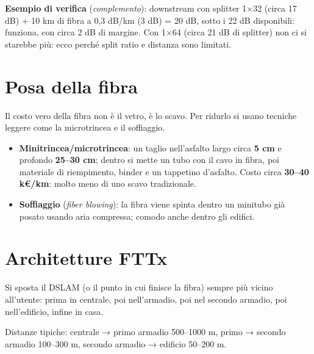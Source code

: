 \textbf{Esempio di verifica} (\emph{complemento}): downstream con splitter 1×32 (circa 17 dB) + 10 km di fibra a 0,3 dB/km (3 dB) = 20 dB, sotto i 22 dB disponibili: funziona, con circa 2 dB di margine. Con 1×64 (circa 21 dB di splitter) non ci si starebbe più: ecco perché split ratio e distanza sono limitati.

\section{Posa della fibra}

\begin{inbreve}

Il costo vero della fibra non è il vetro, è lo scavo. Per ridurlo si usano tecniche leggere come la microtrincea e il soffiaggio.

\end{inbreve}

\begin{itemize}
\tightlist
\item
  \textbf{Minitrincea/microtrincea}: un taglio nell'asfalto largo circa \textbf{5 cm} e profondo \textbf{25--30 cm}; dentro si mette un tubo con il cavo in fibra, poi materiale di riempimento, binder e un tappetino d'asfalto. Costo circa \textbf{30--40 k€/km}: molto meno di uno scavo tradizionale.
\item
  \textbf{Soffiaggio} (\emph{fiber blowing}): la fibra viene spinta dentro un minitubo già posato usando aria compressa; comodo anche dentro gli edifici.
\end{itemize}

\section{Architetture FTTx}

\begin{inbreve}

Si sposta il DSLAM (o il punto in cui finisce la fibra) sempre più vicino all'utente: prima in centrale, poi nell'armadio, poi nel secondo armadio, poi nell'edificio, infine in casa.

\end{inbreve}

Distanze tipiche: centrale → primo armadio 500--1000 m, primo → secondo armadio 100--300 m, secondo armadio → edificio 50--200 m.

